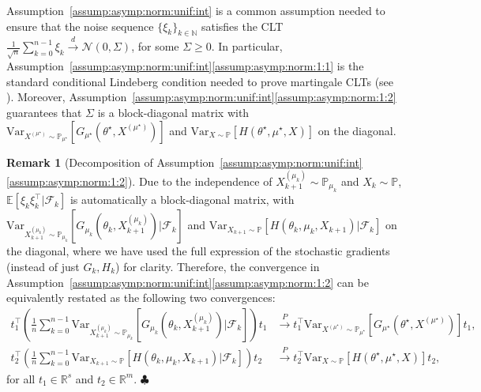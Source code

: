 \documentclass[11pt,a4paper]{article}
\theoremstyle{definition}
\newtheorem{remark}[theorem]{Remark}
\begin{document}
Assumption~\ref{assump:asymp:norm:unif:int} is a common assumption needed to ensure that the noise sequence $\{\xi_k\}_{k \in \mathbb N}$ satisfies the CLT $\frac{1}{\sqrt{n}} \sum_{k=0}^{n-1} \xi_k \overset{d}{\to} \mathcal N(0,\Sigma)$, for some $\Sigma \geq 0$. In particular, Assumption~\ref{assump:asymp:norm:unif:int}\ref{assump:asymp:norm:1:1} is the standard conditional Lindeberg condition needed to prove martingale CLTs (see \cite[Chapter~3]{hall2014martingale}). Moreover, Assumption~\ref{assump:asymp:norm:unif:int}\ref{assump:asymp:norm:1:2} guarantees that $\Sigma$ is a block-diagonal matrix with $\text{Var}_{X^{(\mu^\star)} \sim \mathbb P_{\mu^\star}}\left[ G_{\mu^\star}(\theta^\star,X^{(\mu^\star)})\right]$ and $\text{Var}_{X \sim \mathbb P}\left[ H(\theta^\star, \mu^\star, X)\right]$ on the diagonal. 

\begin{remark}[Decomposition of Assumption~\ref{assump:asymp:norm:unif:int}\ref{assump:asymp:norm:1:2}]
\label{assump:decomp}
Due to the independence of $X_{k+1}^{(\mu_k)} \sim \mathbb P_{\mu_k}$ and $X_k \sim \mathbb P$, $\mathbb E \left[\xi_k \xi_k^\top | \mathcal F_k \right]$ is automatically a block-diagonal matrix, with $\text{Var}_{X_{k+1}^{(\mu_{k})} \sim \mathbb P_{\mu_k}}\left[ G_{\mu_k}(\theta_k,X_{k+1}^{(\mu_k)}) | \mathcal F_k\right]$ and $\text{Var}_{X_{k+1} \sim \mathbb P}\left[ H(\theta_k, \mu_k, X_{k+1})| \mathcal F_k\right]$ on the diagonal, where we have used the full expression of the stochastic gradients (instead of just $G_k, H_k$) for clarity. Therefore, the convergence in Assumption~\ref{assump:asymp:norm:unif:int}\ref{assump:asymp:norm:1:2} can be equivalently restated as the following two convergences:
\begin{align*}
    t_1^\top \left(\frac{1}{n} \sum_{k=0}^{n-1} \text{Var}_{X_{k+1}^{(\mu_{k})} \sim \mathbb P_{\mu_k}}\left[ G_{\mu_k}(\theta_k,X_{k+1}^{(\mu_k)}) | \mathcal F_k\right] \right) t_1 
    &\overset{P}{\to} 
    t_1^\top 
    \text{Var}_{X^{(\mu^\star)} \sim \mathbb P_{\mu^\star}}\left[ G_{\mu^\star}(\theta^\star,X^{(\mu^\star)})\right] t_1, \\
    t_2^\top \left(\frac{1}{n} \sum_{k=0}^{n-1} \text{Var}_{X_{k+1} \sim \mathbb P}\left[ H(\theta_k, \mu_k, X_{k+1})| \mathcal F_k\right]\right) t_2 
    &\overset{P}{\to} 
    t_2^\top  \text{Var}_{X \sim \mathbb P}\left[ H(\theta^\star, \mu^\star, X)\right] t_2,
\end{align*}
for all $t_1 \in \mathbb R^s$ and $t_2 \in \mathbb R^m$. \hfill $\clubsuit$
\end{remark}
\end{document}
